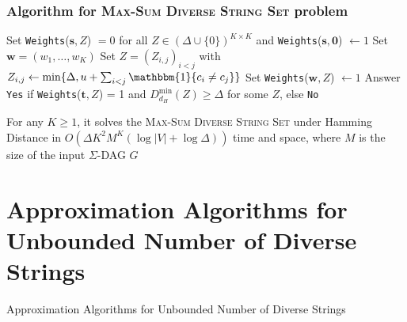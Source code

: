\documentclass{beamer}
\begin{document}
\begin{frame}
    \frametitle{Algorithm for \textsc{Max-Sum Diverse String Set} problem}
    \begin{algorithm}[H] \label{alg:dp2}
        \footnotesize{\caption{}}
        \footnotesize{\begin{algorithmic}[1]
                \State Set \texttt{Weights}($\mathbf{s}, Z$) $=0$ for all $Z \in (\Delta \cup \{0\})^{K \times K}$ and \texttt{Weights}($\mathbf{s}, \mathbf{0}$) $\gets 1$
                \State Set $\mathbf{w} = (w_1, \dots, w_K)$
                \State Set $Z = (Z_{i,j})_{i<j}$ with $Z_{i,j} \gets \min \{\Delta, u + \sum_{i<j}\mathbbm{1}\{c_i \neq c_j\}\}$
                \State Set \texttt{Weights}($\mathbf{w}, Z$) $\gets 1$ 
                \EndFor
                \EndFor
                \EndFor
                \EndFor
                \State Answer \texttt{Yes} if \texttt{Weights}($\mathbf{t}, Z$) = 1 and $D_{d_H}^{\text{min}}(Z) \geq \Delta$ for some $Z$, else \texttt{No}
            \end{algorithmic}}
    \end{algorithm}
    \small{For any $K \geq 1$, it solves the \textsc{Max-Sum Diverse String Set} under Hamming Distance in $O(\Delta K^2 M^K (\log |V| + \log \Delta))$ time and space, where $M$ is the size of the input $\Sigma$-DAG $G$}
\end{frame}

\section{Approximation Algorithms for Unbounded Number of Diverse Strings}
\begin{frame}
    \begin{center}
        \huge{Approximation Algorithms for Unbounded Number of Diverse Strings}
    \end{center}
\end{frame}
\end{document}
